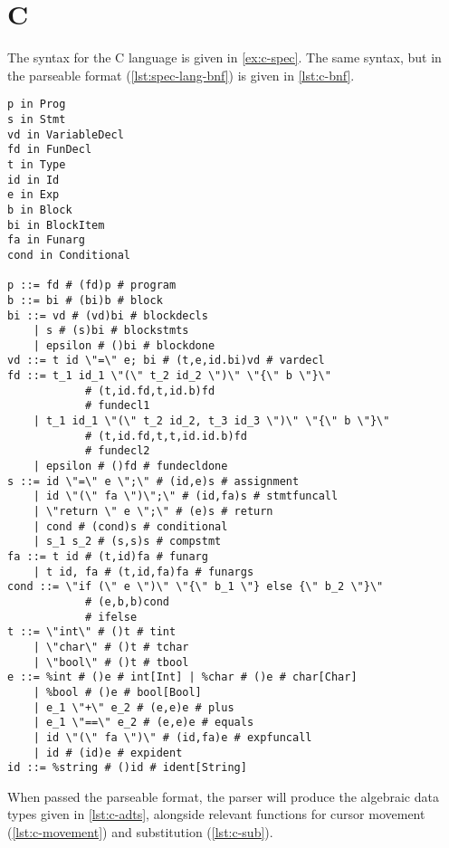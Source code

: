 \section{C}

The syntax for the C language is given in \cref{ex:c-spec}.
The same syntax, but in the parseable format (\cref{lst:spec-lang-bnf}) is given in \cref{lst:c-bnf}.

\begin{minipage}{\textwidth}
    \begin{lstlisting}[style=inline, caption={Parseable format of C language syntax}, label={lst:c-bnf}]
p in Prog
s in Stmt
vd in VariableDecl
fd in FunDecl
t in Type
id in Id
e in Exp
b in Block
bi in BlockItem
fa in Funarg
cond in Conditional

p ::= fd # (fd)p # program
b ::= bi # (bi)b # block
bi ::= vd # (vd)bi # blockdecls 
    | s # (s)bi # blockstmts 
    | epsilon # ()bi # blockdone
vd ::= t id \"=\" e; bi # (t,e,id.bi)vd # vardecl
fd ::= t_1 id_1 \"(\" t_2 id_2 \")\" \"{\" b \"}\" 
            # (t,id.fd,t,id.b)fd 
            # fundecl1 
    | t_1 id_1 \"(\" t_2 id_2, t_3 id_3 \")\" \"{\" b \"}\" 
            # (t,id.fd,t,t,id.id.b)fd 
            # fundecl2 
    | epsilon # ()fd # fundecldone
s ::= id \"=\" e \";\" # (id,e)s # assignment 
    | id \"(\" fa \")\";\" # (id,fa)s # stmtfuncall 
    | \"return \" e \";\" # (e)s # return 
    | cond # (cond)s # conditional 
    | s_1 s_2 # (s,s)s # compstmt
fa ::= t id # (t,id)fa # funarg 
    | t id, fa # (t,id,fa)fa # funargs
cond ::= \"if (\" e \")\" \"{\" b_1 \"} else {\" b_2 \"}\" 
            # (e,b,b)cond 
            # ifelse
t ::= \"int\" # ()t # tint 
    | \"char\" # ()t # tchar 
    | \"bool\" # ()t # tbool
e ::= %int # ()e # int[Int] | %char # ()e # char[Char] 
    | %bool # ()e # bool[Bool] 
    | e_1 \"+\" e_2 # (e,e)e # plus 
    | e_1 \"==\" e_2 # (e,e)e # equals 
    | id \"(\" fa \")\" # (id,fa)e # expfuncall 
    | id # (id)e # expident
id ::= %string # ()id # ident[String]
\end{lstlisting}
\end{minipage}

When passed the parseable format, the parser will produce the algebraic data types
given in \cref{lst:c-adts}, alongside relevant functions for cursor movement (\cref{lst:c-movement})
and substitution (\cref{lst:c-sub}).

